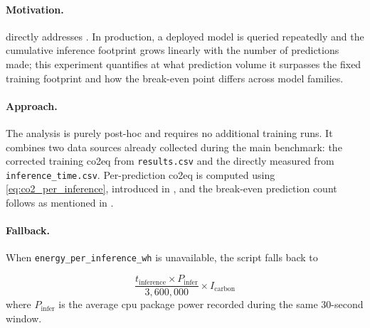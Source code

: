 \paragraph{Motivation.}
 directly addresses . In production, a deployed model is queried repeatedly and the cumulative inference footprint grows linearly with the number of predictions made; this experiment quantifies at what prediction volume it surpasses the fixed training footprint and how the break-even point differs across model families.

\paragraph{Approach.}
The analysis is purely post-hoc and requires no additional training runs. It combines two data sources already collected during the main benchmark: the corrected training \gls{co2eq} from \texttt{results.csv} and the directly measured  from \texttt{inference\_time.csv}. Per-prediction \gls{co2eq} is computed using \eqref{eq:co2_per_inference}, introduced in , and the break-even prediction count follows as mentioned in .

\paragraph{Fallback.}
When \texttt{energy\_per\_inference\_wh} is unavailable, the script falls back to 

\begin{equation}
\frac{t_{\text{inference}} \times P_{\text{infer}}}{3{,}600{,}000} \times I_{\text{carbon}}
\end{equation}
where $P_{\text{infer}}$ is the average \gls{cpu} package power recorded during the same 30-second window.
